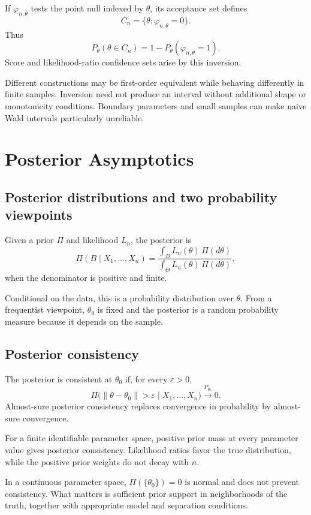If $\varphi_{n,\theta}$ tests the point null indexed by $\theta$,
its acceptance set defines
\[
C_n=\{\theta:\varphi_{n,\theta}=0\}.
\]
Thus
\[
P_\theta(\theta\in C_n)
=
1-P_\theta(\varphi_{n,\theta}=1).
\]
Score and likelihood-ratio confidence sets arise by this inversion.

Different constructions may be first-order equivalent while
behaving differently in finite samples. Inversion need not produce
an interval without additional shape or monotonicity conditions.
Boundary parameters and small samples can make naive Wald
intervals particularly unreliable.

\section{Posterior Asymptotics}

\subsection{Posterior distributions and two probability viewpoints}

Given a prior $\Pi$ and likelihood $L_n$, the posterior is
\[
\Pi(B\mid X_1,\ldots,X_n)
=
\frac{\int_B L_n(\theta)\,\Pi(d\theta)}
{\int_\Theta L_n(\theta)\,\Pi(d\theta)},
\]
when the denominator is positive and finite.

Conditional on the data, this is a probability distribution over
$\theta$. From a frequentist viewpoint, $\theta_0$ is fixed and the
posterior is a random probability measure because it depends on
the sample.

\subsection{Posterior consistency}

The posterior is consistent at $\theta_0$ if, for every
$\varepsilon>0$,
\[
\Pi\bigl(\|\theta-\theta_0\|>\varepsilon\mid X_1,\ldots,X_n\bigr)
\xrightarrow{P_{\theta_0}}0.
\]
Almost-sure posterior consistency replaces convergence in
probability by almost-sure convergence.

For a finite identifiable parameter space, positive prior mass at
every parameter value gives posterior consistency. Likelihood
ratios favor the true distribution, while the positive prior
weights do not decay with $n$.

In a continuous parameter space, $\Pi(\{\theta_0\})=0$ is normal
and does not prevent consistency. What matters is sufficient prior
support in neighborhoods of the truth, together with appropriate
model and separation conditions.

